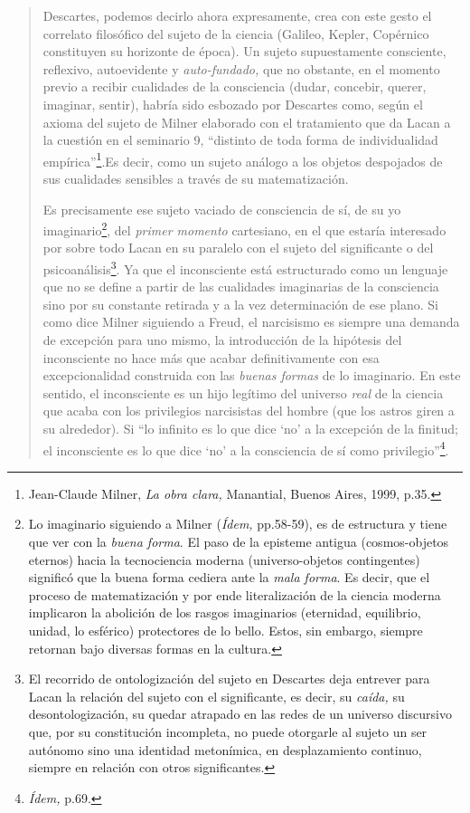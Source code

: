 \begin{quote}
Descartes, podemos decirlo ahora expresamente, crea con este gesto el correlato filosófico del sujeto de la ciencia (Galileo, Kepler, Copérnico constituyen su horizonte de época). Un sujeto supuestamente consciente, reflexivo, autoevidente y \emph{auto-fundado,} que no obstante, en el momento previo a recibir cualidades de la consciencia (dudar, concebir, querer, imaginar, sentir), habría sido esbozado por Descartes como, según el axioma del sujeto de Milner elaborado con el tratamiento que da Lacan a la cuestión en el seminario 9, \enquote{distinto de toda forma de individualidad empírica}\footnote{Jean-Claude Milner, \emph{La obra clara,} Manantial, Buenos Aires, 1999, p.35.}.Es decir, como un sujeto análogo a los objetos despojados de sus cualidades sensibles a través de su matematización.

Es precisamente ese sujeto vaciado de consciencia de sí, de su yo imaginario\footnote{Lo imaginario siguiendo a Milner (\emph{Ídem,} pp.58-59), es de estructura y tiene que ver con la \emph{buena forma}. El paso de la episteme antigua (cosmos-objetos eternos) hacia la tecnociencia moderna (universo-objetos contingentes) significó que la buena forma cediera ante la \emph{mala forma}. Es decir, que el proceso de matematización y por ende literalización de la ciencia moderna implicaron la abolición de los rasgos imaginarios (eternidad, equilibrio, unidad, lo esférico) protectores de lo bello. Estos, sin embargo, siempre retornan bajo diversas formas en la cultura.}, del \emph{primer momento} cartesiano, en el que estaría interesado por sobre todo Lacan en su paralelo con el sujeto del significante o del psicoanálisis\footnote{El recorrido de ontologización del sujeto en Descartes deja entrever para Lacan la relación del sujeto con el significante, es decir, su \emph{caída,} su desontologización, su quedar atrapado en las redes de un universo discursivo que, por su constitución incompleta, no puede otorgarle al sujeto un ser autónomo sino una identidad metonímica, en desplazamiento continuo, siempre en relación con otros significantes.}. Ya que el inconsciente está estructurado como un lenguaje que no se define a partir de las cualidades imaginarias de la consciencia sino por su constante retirada y a la vez determinación de ese plano. Si como dice Milner siguiendo a Freud, el narcisismo es siempre una demanda de excepción para uno mismo, la introducción de la hipótesis del inconsciente no hace más que acabar definitivamente con esa excepcionalidad construida con las \emph{buenas formas} de lo imaginario. En este sentido, el inconsciente es un hijo legítimo del universo \emph{real} de la ciencia que acaba con los privilegios narcisistas del hombre (que los astros giren a su alrededor). Si \enquote{lo infinito es lo que dice \enquote{no} a la excepción de la finitud; el inconsciente es lo que dice \enquote{no} a la consciencia de sí como privilegio}\footnote{\emph{Ídem,} p.69.}.


\end{quote}

